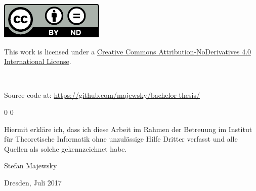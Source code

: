 \documentclass[
 paper=A4,pagesize=automedia,fontsize=11pt,
 BCOR=10mm,DIV=16,
 twoside,headinclude,footinclude=false,
 bibtotocnumbered,          %
 liststotoc,                %
 listsleft,
 pointlessnumbers,          %
 cleardoublepage=empty      %
]{scrbook}
\newcounter{theorem}
\theoremstyle{definition}
\numberwithin{theorem}{chapter}
\numberwithin{equation}{chapter}
\numberwithin{figure}{chapter}
\numberwithin{table}{chapter}
\begin{document}
\begin{titlepage}
 \vspace*{5em}
 \begin{singlespace}
  \hspace{0.18\linewidth}
  \begin{minipage}{0.1\linewidth}
   \includegraphics[width=\linewidth]{img/by-nd.pdf}
  \end{minipage}
  \hspace{0.02\linewidth}
  \begin{minipage}{0.6\linewidth}\footnotesize\flushleft
   This work is licensed under a \href{https://creativecommons.org/licenses/by-nd/4.0/}{Creative Commons Attribution-NoDerivatives 4.0 International License}.
  \end{minipage}\\[-1em]
  \begin{center}\footnotesize
   Source code at: \url{https://github.com/majewsky/bachelor-thesis/}
  \end{center}
 \end{singlespace}
\end{titlepage}

\cleardoublepage
\tableofcontents
\mainmatter





\appendix{}
\renewcommand\thesection{\Alph{section}}
\renewcommand\theequation{\Alph{section}.\arabic{equation}}
\renewcommand\thefigure{\Alph{section}.\arabic{figure}}
\renewcommand\thetable{\Alph{section}.\arabic{table}}
\setcounter{theorem}0
\setcounter{equation}0
\renewcommand\thetheorem{\Alph{section}.\arabic{theorem}}




\backmatter



\clearpage
\thispagestyle{empty}

\vspace*{1.5em}

Hiermit erkläre ich, dass ich diese Arbeit im Rahmen der Betreuung im Institut
für Theoretische Informatik ohne unzulässige Hilfe Dritter verfasst und alle
Quellen als solche gekennzeichnet habe.

\vspace*{15em}

Stefan Majewsky \par
Dresden, Juli 2017
\end{document}
